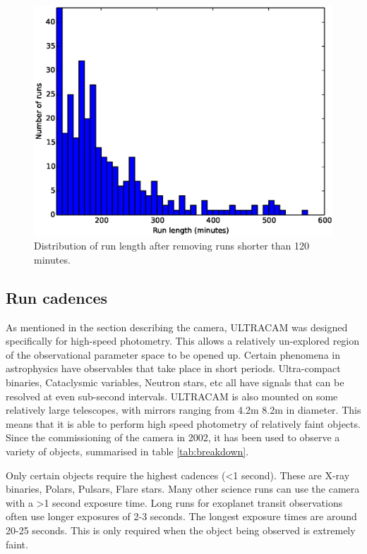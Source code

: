 \begin{figure}[!h]
  \centering
  \includegraphics[width=120mm]{images/hist120-600.eps}
  \caption{Distribution of run length after removing runs shorter than 120 minutes.}
  \label{fig:histogram120-600}
\end{figure}

\subsection{Run cadences}
As mentioned in the section describing the camera, ULTRACAM was designed specifically for high-speed photometry. This allows a relatively un-explored region of the observational parameter space to be opened up. Certain phenomena in astrophysics have observables that take place in short periods. Ultra-compact binaries, Cataclysmic variables, Neutron stars, etc all have signals that can be resolved at even sub-second intervals. ULTRACAM is also mounted on some relatively large telescopes, with mirrors ranging from 4.2m 8.2m in diameter. This means that it is able to perform high speed photometry of relatively faint objects. Since the commissioning of the camera in 2002, it has been used to observe a variety of objects, summarised in table \ref{tab:breakdown}. 

Only certain objects require the highest cadences (\textless 1 second). These are X-ray binaries, Polars, Pulsars, Flare stars. Many other science runs can use the camera with a \textgreater 1 second exposure time. Long runs for exoplanet transit observations often use longer exposures of 2-3 seconds. The longest exposure times are around 20-25 seconds. This is only required when the object being observed is extremely faint.  

